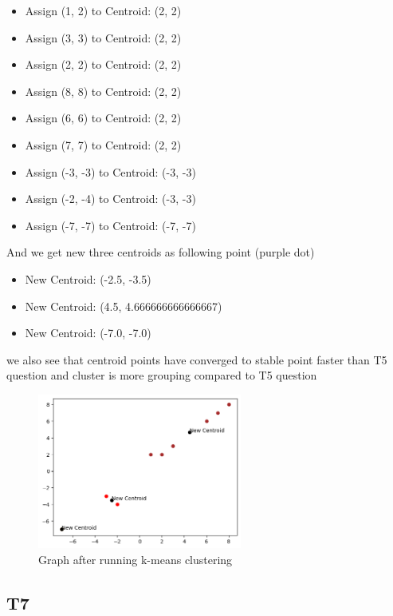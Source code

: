 \documentclass[12pt, a4paper]{article}
\begin{document}
\begin{itemize}
    \item Assign (1, 2) to Centroid: (2, 2)
    \item Assign (3, 3) to Centroid: (2, 2)
    \item Assign (2, 2) to Centroid: (2, 2)
    \item Assign (8, 8) to Centroid: (2, 2)
    \item Assign (6, 6) to Centroid: (2, 2)
    \item Assign (7, 7) to Centroid: (2, 2)
    \item Assign (-3, -3) to Centroid: (-3, -3)
    \item Assign (-2, -4) to Centroid: (-3, -3)
    \item Assign (-7, -7) to Centroid: (-7, -7)
\end{itemize}

And we get new three centroids as following point (purple dot)

\begin{itemize}
    \item New Centroid: (-2.5, -3.5)
    \item New Centroid: (4.5, 4.666666666666667)
    \item New Centroid: (-7.0, -7.0)
\end{itemize}

we also see that centroid points have converged to stable point faster than T5 question 
and cluster is more grouping compared to T5 question

\begin{figure}[ht]
    \centering
    \includegraphics[width=0.6\textwidth]{images/T6_k_means.png}
    \caption{Graph after running k-means clustering}
\end{figure}

\subsection{T7}
\end{document}
